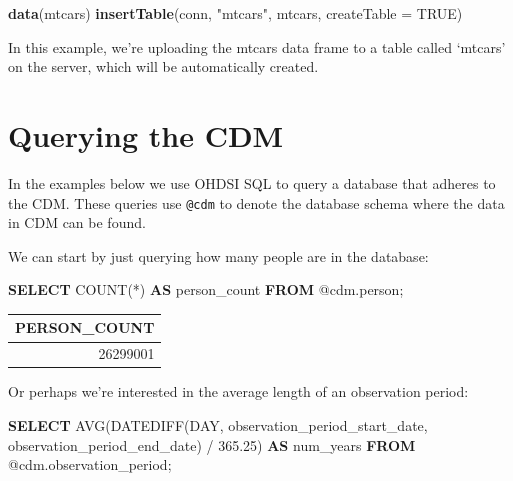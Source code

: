 \documentclass[11pt]{book}
\newenvironment{Shaded}{\begin{snugshade}}{\end{snugshade}}
\newcommand{\KeywordTok}[1]{\textcolor[rgb]{0.13,0.29,0.53}{\textbf{#1}}}
\newcommand{\DataTypeTok}[1]{\textcolor[rgb]{0.13,0.29,0.53}{#1}}
\newcommand{\FloatTok}[1]{\textcolor[rgb]{0.00,0.00,0.81}{#1}}
\newcommand{\StringTok}[1]{\textcolor[rgb]{0.31,0.60,0.02}{#1}}
\newcommand{\OtherTok}[1]{\textcolor[rgb]{0.56,0.35,0.01}{#1}}
\newcommand{\FunctionTok}[1]{\textcolor[rgb]{0.00,0.00,0.00}{#1}}
\newcommand{\NormalTok}[1]{#1}
\begin{document}
\begin{Shaded}
\begin{Highlighting}[]
\KeywordTok{data}\NormalTok{(mtcars)}
\KeywordTok{insertTable}\NormalTok{(conn, }\StringTok{"mtcars"}\NormalTok{, mtcars, }\DataTypeTok{createTable =} \OtherTok{TRUE}\NormalTok{)}
\end{Highlighting}
\end{Shaded}

In this example, we're uploading the mtcars data frame to a table called
`mtcars' on the server, which will be automatically created.

\section{Querying the CDM}\label{QueryTheCdm}

In the examples below we use OHDSI SQL to query a database that adheres
to the CDM. These queries use \texttt{@cdm} to denote the database
schema where the data in CDM can be found.

We can start by just querying how many people are in the database:

\begin{Shaded}
\begin{Highlighting}[]
\KeywordTok{SELECT} \FunctionTok{COUNT}\NormalTok{(*) }\KeywordTok{AS}\NormalTok{ person_count }\KeywordTok{FROM}\NormalTok{ @cdm.person;}
\end{Highlighting}
\end{Shaded}

\begin{longtable}[]{@{}r@{}}
\toprule
PERSON\_COUNT\tabularnewline
\midrule
\endhead
26299001\tabularnewline
\bottomrule
\end{longtable}

Or perhaps we're interested in the average length of an observation
period:

\begin{Shaded}
\begin{Highlighting}[]
\KeywordTok{SELECT} \FunctionTok{AVG}\NormalTok{(DATEDIFF(}\DataTypeTok{DAY}\NormalTok{, }
\NormalTok{                    observation_period_start_date, }
\NormalTok{                    observation_period_end_date) / }\FloatTok{365.25}\NormalTok{) }\KeywordTok{AS}\NormalTok{ num_years}
\KeywordTok{FROM}\NormalTok{ @cdm.observation_period;}
\end{Highlighting}
\end{Shaded}
\end{document}

